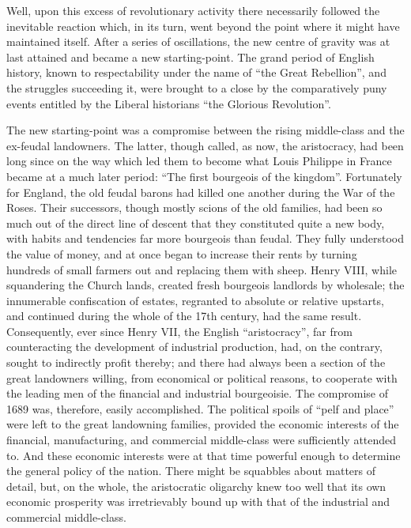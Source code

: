 Well, upon this excess of revolutionary activity there necessarily followed the
inevitable reaction which, in its turn, went beyond the point where it might
have maintained itself. After a series of oscillations, the new centre of
gravity was at last attained and became a new starting-point. The grand period
of English history, known to respectability under the name of ``the Great
Rebellion'', and the struggles succeeding it, were brought to a close by the
comparatively puny events entitled by the Liberal historians ``the Glorious
Revolution''.

The new starting-point was a compromise between the rising middle-class and the
ex-feudal landowners. The latter, though called, as now, the aristocracy, had
been long since on the way which led them to become what Louis Philippe in
France became at a much later period: ``The first bourgeois of the kingdom''.
Fortunately for England, the old feudal barons had killed one another during the
War of the Roses. Their successors, though mostly scions of the old families,
had been so much out of the direct line of descent that they constituted quite a
new body, with habits and tendencies far more bourgeois than feudal. They fully
understood the value of money, and at once began to increase their rents by
turning hundreds of small farmers out and replacing them with sheep. Henry VIII,
while squandering the Church lands, created fresh bourgeois landlords by
wholesale; the innumerable confiscation of estates, regranted to absolute or
relative upstarts, and continued during the whole of the 17th century, had the
same result. Consequently, ever since Henry VII, the English ``aristocracy'',
far from counteracting the development of industrial production, had, on the
contrary, sought to indirectly profit thereby; and there had always been a
section of the great landowners willing, from economical or political reasons,
to cooperate with the leading men of the financial and industrial bourgeoisie.
The compromise of 1689 was, therefore, easily accomplished. The political spoils
of ``pelf and place'' were left to the great landowning families, provided the
economic interests of the financial, manufacturing, and commercial middle-class
were sufficiently attended to. And these economic interests were at that time
powerful enough to determine the general policy of the nation. There might be
squabbles about matters of detail, but, on the whole, the aristocratic oligarchy
knew too well that its own economic prosperity was irretrievably bound up with
that of the industrial and commercial middle-class.

